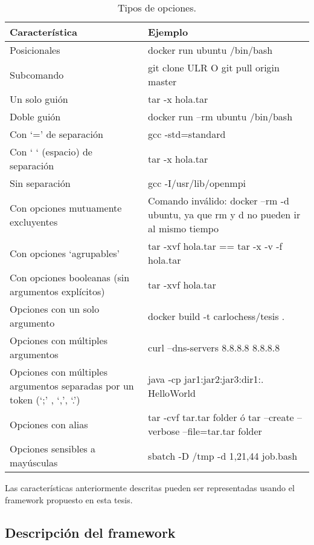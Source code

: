 \begin{table}
  \centering
\begin{tabular}{| p{7cm} | p{7cm}| }
\hline
Característica & Ejemplo
\\ \hline
Posicionales & docker run ubuntu /bin/bash
\\ \hline
Subcomando & git clone ULR O git pull origin master
\\ \hline
Un solo guión & tar -x hola.tar
\\ \hline
Doble guión & docker run --rm ubuntu /bin/bash
\\ \hline
Con ‘=’ de separación & gcc -std=standard
\\ \hline
Con ‘ ‘ (espacio) de separación & tar -x hola.tar
\\ \hline
Sin separación & gcc -I/usr/lib/openmpi
\\ \hline
Con opciones mutuamente excluyentes & Comando inválido: docker --rm -d ubuntu, ya que rm y d \newline no pueden ir al mismo tiempo
\\ \hline
Con opciones ‘agrupables’& tar -xvf hola.tar == tar -x -v -f hola.tar
\\ \hline
Con opciones booleanas (sin argumentos explícitos) & tar -xvf hola.tar
\\ \hline
Opciones con un solo argumento & docker build -t carlochess/tesis .
\\ \hline
Opciones con múltiples argumentos & curl --dns-servers 8.8.8.8 8.8.8.8
\\ \hline
Opciones con múltiples argumentos separadas por un token (‘;’ , ‘,’, ‘.’) &
java -cp jar1:jar2:jar3:dir1:. HelloWorld
\\ \hline
Opciones con alias & tar -cvf tar.tar folder \newline ó \newline tar --create --verbose --file=tar.tar folder
\\ \hline
Opciones sensibles a mayúsculas & sbatch -D /tmp -d 1,21,44 job.bash
\\ \hline
  \end{tabular}
  \caption{Tipos de opciones.}
  \label{tab:tiposopts}
\end{table}

Las características anteriormente descritas pueden ser representadas usando el framework propuesto en esta tesis.

\subsection{Descripción del framework}

